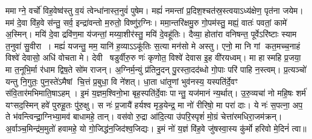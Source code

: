 ममाग्ने॒ वर्चो॑ विह॒वेष्व॑स्तु व॒यं त्वेन्धा॑नास्त॒नुवं॑ पुषेम। मह्यं॑ नमन्तां प्र॒दिश॒श्चत॑स्र॒स्त्वयाऽध्य॑क्षेण॒ पृत॑ना जयेम। मम॑ दे॒वा वि॑ह॒वे स॑न्तु॒ सर्व॒ इन्द्रा॑वन्तो म॒रुतो॒ विष्णु॑र॒ग्निः। ममा॒न्तरि॑क्षमु॒रु गो॒पम॑स्तु॒ मह्यं॒ वातः॑ पवतां॒ कामे॑ अ॒स्मिन्। मयि॑ दे॒वा द्रवि॑ण॒मा य॑जन्तां॒ मय्या॒शीर॑स्तु॒ मयि॑ दे॒वहू॑तिः। दैव्या॒ होता॑रा वनिषन्त॒ पूर्वेऽरि॑ष्टाः स्याम त॒नुवा॑ सु॒वीरा। मह्यं॑ यजन्तु॒ मम॒ यानि॑ ह॒व्याऽऽकू॑तिः स॒त्या मन॑सो मे अस्तु। एनो॒ मा नि गां कत॒मच्च॒नाहं विश्वे॑ देवासो॒ अधि॑ वोचता मे। देवी षडुर्वीरु॒रु णः॑ कृणोत॒ विश्वे॑ देवास इ॒ह वी॑रयध्वम्। मा हास्महि प्र॒जया॒ मा त॒नूभि॒र्मा र॑धाम द्विष॒ते सो॑म राजन्। अ॒ग्निर्म॒न्युं प्र॑तिनु॒दन् पु॒रस्ता॒दद॑ब्धो गो॒पाः परि॑ पाहि न॒स्त्वम्। प्र॒त्यञ्चो॑ यन्तु नि॒गुतः॒ पुन॒स्ते॑ऽमैषां चि॒त्तं प्र॒बुधा॒ वि ने॑शत्। धा॒ता धा॑तृ॒णां भुव॑नस्य॒ यस्पति॑र्दे॒वꣳ स॑वि॒तार॑मभिमाति॒षाऽहम्। इ॒मं य॒ज्ञम॒श्विनो॒भा बृह॒स्पति॑र्दे॒वाः पान्तु॒ यज॑मानं न्य॒र्थात्। उ॒रु॒व्यचा॑ नो महि॒षः शर्म॑ यꣳसद॒स्मिन् हवे॑ पुरुहू॒तः पु॑रु॒क्षु। स नः॑ प्र॒जायै॑ हर्यश्व मृड॒येन्द्र॒ मा नो॑ रीरिषो॒ मा परा॑ दाः। ये नः॑ स॒पत्ना॒ अप॒ ते भ॑वन्त्विन्द्रा॒ग्निभ्या॒मव॑ बाधामहे॒ तान्। वस॑वो रु॒द्रा आ॑दि॒त्या उ॑परि॒स्पृशं॑ मो॒ग्रं चेत्ता॑रमधिरा॒जम॑क्रन्। अ॒र्वाञ्च॒मिन्द्र॑म॒मुतो॑ हवामहे॒ यो गो॒जिद्ध॑न॒जिद॑श्व॒जिद्यः। इ॒मं नो॑ य॒ज्ञं वि॑ह॒वे जु॑षस्वा॒स्य कु॑र्मो हरिवो मे॒दिनं॑ त्वा॥

